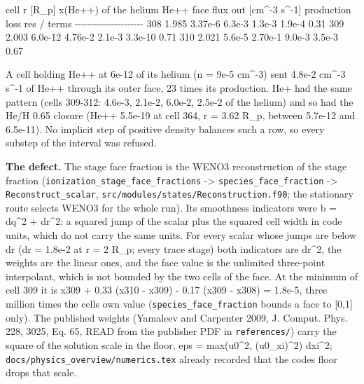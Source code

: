 \documentclass[english,a4paper]{my_memo}
\begin{document}
\textbar{} cell \textbar{} r {[}R\_p{]} \textbar{} x(He++) of the helium \textbar{} He++ face flux out {[}cm\^{}-3 s\^{}-1{]} \textbar{} production \textbar{} loss \textbar{} \textbar res\textbar{} / terms \textbar{}
\textbar-\/-\/-\textbar-\/-\/-\textbar-\/-\/-\textbar-\/-\/-\textbar-\/-\/-\textbar-\/-\/-\textbar-\/-\/-\textbar{}
\textbar{} 308 \textbar{} 1.985 \textbar{} 3.37e-6 \textbar{} 6.3e-3 \textbar{} 1.3e-3 \textbar{} 1.9e-4 \textbar{} 0.31 \textbar{}
\textbar{} 309 \textbar{} 2.003 \textbar{} 6.0e-12 \textbar{} 4.76e-2 \textbar{} 2.1e-3 \textbar{} 3.3e-10 \textbar{} 0.71 \textbar{}
\textbar{} 310 \textbar{} 2.021 \textbar{} 5.6e-5 \textbar{} 2.70e-1 \textbar{} 9.0e-3 \textbar{} 3.5e-3 \textbar{} 0.67 \textbar{}

A cell holding He++ at 6e-12 of its helium (n = 9e-5 cm\^{}-3) sent 4.8e-2
cm\^{}-3 s\^{}-1 of He++ through its outer face, 23 times its production. He+ had
the same pattern (cells 309-312: 4.6e-3, 2.1e-2, 6.0e-2, 2.5e-2 of the
helium) and so had the He/H 0.65 closure (He++ 5.5e-19 at cell 364, r = 3.62
R\_p, between 5.7e-12 and 6.5e-11). No implicit step of positive density
balances such a row, so every substep of the interval was refused.

\textbf{The defect.} The stage face fraction is the WENO3 reconstruction of the
stage fraction (\texttt{ionization\_stage\_face\_fractions} -\textgreater{} \texttt{species\_face\_fraction}
-\textgreater{} \texttt{Reconstruct\_scalar}, \texttt{src/modules/states/Reconstruction.f90}; the
stationary route selects WENO3 for the whole run). Its smoothness indicators
were b = dq\^{}2 + dr\^{}2: a squared jump of the scalar plus the squared cell
width in code units, which do not carry the same units. For every scalar
whose jumps are below dr (dr = 1.8e-2 at r = 2 R\_p; every trace stage) both
indicators are dr\^{}2, the weights are the linear ones, and the face value is
the unlimited three-point interpolant, which is not bounded by the two cells
of the face. At the minimum of cell 309 it is
x309 + 0.33 (x310 - x309) - 0.17 (x309 - x308) = 1.8e-5, three million times
the cell\textquotesingle s own value (\texttt{species\_face\_fraction} bounds a face to {[}0,1{]} only).
The published weights (Yamaleev and Carpenter 2009, J. Comput. Phys. 228,
3025, Eq. 65, READ from the publisher PDF in \texttt{references/}) carry the square
of the solution scale in the floor, eps = max(\textbar\textbar u0\^{}2\textbar\textbar, \textbar\textbar(u0\_xi)\^{}2\textbar\textbar) dxi\^{}2;
\texttt{docs/physics\_overview/numerics.tex} already recorded that the code\textquotesingle s floor
drops that scale.
\end{document}
